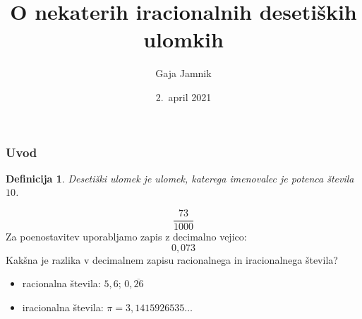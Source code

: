 \documentclass{beamer}
\title{O nekaterih iracionalnih desetiških ulomkih}
\author{Gaja Jamnik}
\institute{Fakulteta za matematiko in fiziko \\
Oddelek za matematiko}
\date{2.\ april 2021}
\newtheorem{definicija}{Definicija}
\begin{document}
    

\begin{frame}
    \titlepage
\end{frame}



\begin{frame}
    \frametitle{Uvod}
    \begin{definicija}
        \alert{Desetiški ulomek}
        je ulomek, katerega imenovalec je potenca števila $10$.

    \end{definicija}
    \[ \frac{73}{1000}\]
    Za poenostavitev uporabljamo zapis z decimalno vejico:
    \[ 0,073\]
    \pause
    Kakšna je razlika v decimalnem zapisu racionalnega in iracionalnega števila?


    \pause
    \begin{itemize}
        \item racionalna števila: $5,6$;  $0,\overline{26}$
        \item iracionalna števila: $\pi = 3,1415926535 \ldots$
    \end{itemize}
\end{frame}


\end{document}
